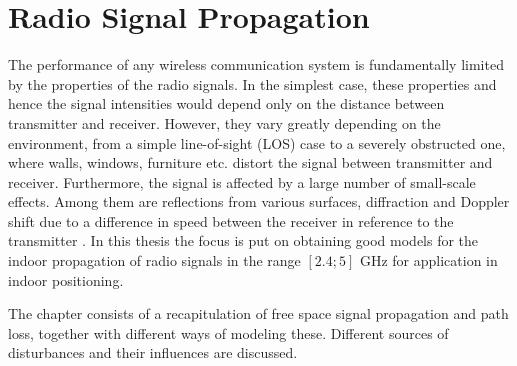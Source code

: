 \documentclass{LTHthesis}
\begin{document}
\chapter{Radio Signal Propagation}
%
\label{chap:RSP}
%
The performance of any wireless communication system is fundamentally limited by the properties of the radio signals. In the simplest case, these properties and hence the signal intensities would depend only on the distance between transmitter and receiver. However, they vary greatly depending on the environment, from a simple line-of-sight (LOS) case to a severely obstructed one, where walls, windows, furniture etc. distort the signal between transmitter and receiver. Furthermore, the signal is affected by a large number of small-scale effects. Among them are reflections from various surfaces, diffraction and Doppler shift due to a difference in speed between the receiver in reference to the transmitter \cite{rappaport96}. In this thesis the focus is put on obtaining good models for the indoor propagation of radio signals in the range $[2.4;5]$ GHz for application in indoor positioning.

The chapter consists of a recapitulation of free space signal propagation and path loss, together with different ways of modeling these. Different sources of disturbances and their influences are discussed.
%
\end{document}
